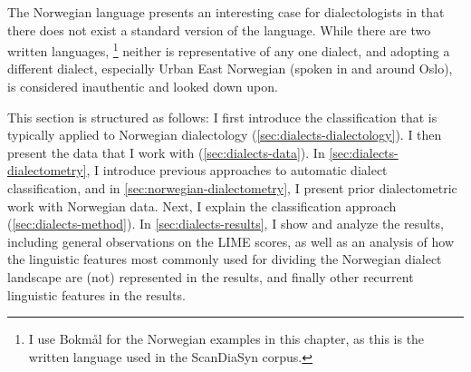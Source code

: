 \label{chap:dialects}

The Norwegian language presents an interesting case for dialectologists in that there does not exist a standard version of the language.
While there are two written languages,%
\footnote{I use Bokm\aa{}l for the Norwegian examples in this chapter, as this is the written language used in the ScanDiaSyn corpus.}
neither is representative of any one dialect, and adopting a different dialect, especially Urban East Norwegian (spoken in and around Oslo), is considered inauthentic and looked down upon.

This section is structured as follows:
I first introduce the classification that is typically applied to Norwegian dialectology (\autoref{sec:dialects-dialectology}).
I then present the data that I work with (\autoref{sec:dialects-data}).
In \autoref{sec:dialects-dialectometry}, I introduce previous approaches to automatic dialect classification, and in \autoref{sec:norwegian-dialectometry}, I present prior dialectometric work with Norwegian data.
Next, I explain the classification approach (\autoref{sec:dialects-method}).
In \autoref{sec:dialects-results}, I show and analyze the results, including general observations on the LIME scores, as well as an analysis of how the linguistic features most commonly used for dividing the Norwegian dialect landscape are (not) represented in the results, and finally other recurrent linguistic features in the results.

